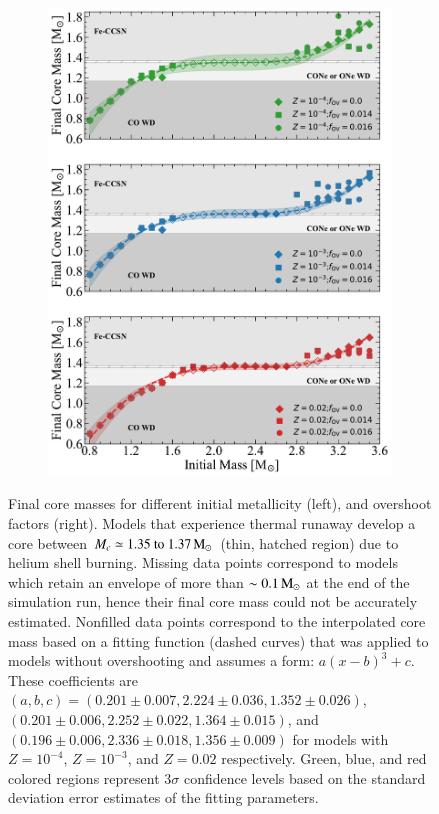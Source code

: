 \documentclass[main.tex]{subfiles}
\begin{document}
\begin{figure}[h!]
\begin{subfigure}{.5\textwidth}
        \centering
        \includegraphics[width=0.95\columnwidth]{figures/chapter2/core_growth/series1_coreGrowth_panel2_interpolated.pdf}
    \end{subfigure}
    \caption{Final core masses for different initial metallicity (left), and overshoot factors (right).
    Models that experience thermal runaway develop a core between $M_c \simeq \numrange{1.35}{1.37}\msun$ 
    (thin, hatched region) due to helium shell burning. Missing data points correspond to models which retain an 
    envelope of more than $\sim 0.1\mathrm{\,M_\odot}$ at the end of the simulation run, hence their final core mass could not be 
    accurately estimated. Nonfilled data points correspond to the interpolated core mass based on a fitting function
    (dashed curves) that was applied to models without overshooting and assumes a form: $a(x-b)^3 + c$. 
    These coefficients are $(a,b,c) = (0.201 \pm 0.007, 2.224 \pm 0.036, 1.352 \pm 0.026)$, $(0.201 \pm 0.006, 2.252 \pm 0.022, 1.364 \pm 0.015)$, and $(0.196 \pm 0.006, 2.336 \pm 0.018, 1.356 \pm 0.009)$ 
    for models with $Z = 10^{-4}$, $Z=10^{-3}$, and $Z=0.02$ respectively. Green, blue, and red colored regions represent $3\sigma$ confidence levels based on the standard deviation error estimates of the fitting parameters.}
    \label{fig:coreGrowth}
\end{figure}
\end{document}
